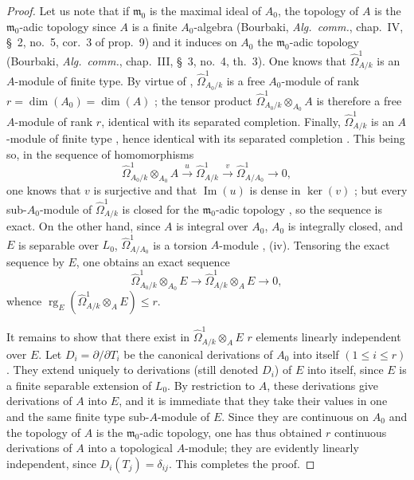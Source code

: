 \begin{proof}
Let us note that if $\mathfrak{m}_0$ is the maximal ideal of $A_0$, the topology of $A$ is the $\mathfrak{m}_0$-adic topology since $A$ is a finite $A_0$-algebra (Bourbaki, \emph{Alg.\ comm.}, chap.~IV, \S~2, no.~5, cor.~3 of prop.~9) and it induces on $A_0$ the $\mathfrak{m}_0$-adic topology (Bourbaki, \emph{Alg.\ comm.}, chap.~III, \S~3, no.~4, th.~3).
One knows  that $\widehat{\Omega}^1_{A/k}$ is an $A$-module of finite type.
By virtue of , $\widehat{\Omega}^1_{A_0/k}$ is a free $A_0$-module of rank $r=\dim(A_0)=\dim(A)$ ; the tensor product $\widehat{\Omega}^1_{A_0/k}\otimes_{A_0}A$ is therefore a free $A$-module of rank $r$, identical with its separated completion.
Finally, $\widehat{\Omega}^1_{A/k}$ is an $A$-module of finite type , hence identical with its separated completion .
This being so, in the sequence of homomorphisms
\begin{equation}
\tag{21.9.5.2}
  \label{0.21.9.5.2}
  \widehat{\Omega}^1_{A_0/k}\otimes_{A_0} A\xrightarrow{u}\widehat{\Omega}^1_{A/k}\xrightarrow{v}\widehat{\Omega}^1_{A/A_0}\to 0,
\end{equation}
one knows that $v$ is surjective and that $\operatorname{Im}(u)$ is dense in $\ker(v)$ ; but every sub-$A_0$-module of $\widehat{\Omega}^1_{A/k}$ is closed for the $\mathfrak{m}_0$-adic topology , so the sequence  is exact.
On the other hand, since $A$ is integral over $A_0$, $A_0$ is integrally closed, and $E$ is separable over $L_0$, $\widehat{\Omega}^1_{A/A_0}$ is a torsion $A$-module , (iv).
Tensoring the exact sequence  by $E$, one obtains an exact sequence
\[
  \widehat{\Omega}^1_{A_0/k}\otimes_{A_0}E\longrightarrow
  \widehat{\Omega}^1_{A/k}\otimes_A E\longrightarrow 0,
\]
whence $\operatorname{rg}_E(\widehat{\Omega}^1_{A/k}\otimes_AE)\leqslant r$.

It remains to show that there exist in $\widehat{\Omega}^1_{A/k}\otimes_AE$ $r$ elements linearly independent over $E$.
Let $D_i=\partial/\partial T_i$ be the canonical derivations of $A_0$ into itself $(1\leqslant i\leqslant r)$.
They extend uniquely to derivations (still denoted $D_i$) of $E$ into itself, since $E$ is a finite separable extension of $L_0$.
By restriction to $A$, these derivations give derivations of $A$ into $E$, and it is immediate that they take their values in one and the same finite type sub-$A$-module of $E$.
Since they are continuous on $A_0$ and the topology of $A$ is the $\mathfrak{m}_0$-adic topology, one has thus obtained $r$ continuous derivations of $A$ into a topological $A$-module; they are evidently linearly independent, since $D_i(T_j)=\delta_{ij}$.
This completes the proof.
\end{proof}

